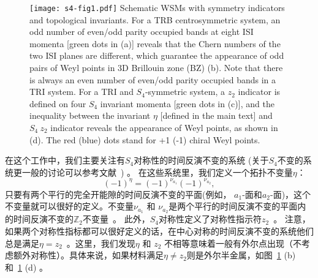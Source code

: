 \begin{figure}[!tb]
    \centering
    \texttt{[image: s4-fig1.pdf]}
        {Schematic WSMs with symmetry indicators and topological invariants.
        For a TRB centrosymmetric system, an odd number of even/odd parity occupied bands at eight ISI momenta [green dots in (a)] reveals that the Chern numbers of the two ISI planes are different, which guarantee the appearance of odd pairs of Weyl points in 3D Brillouin zone (BZ) (b). Note that there is always an even number of even/odd parity occupied bands in a TRI system.
        For a TRI and $S_4$-symmetric system, a $z_2$ indicator is defined on four $S_4$ invariant momenta [green dots in (c)], and the inequality between the invariant $\eta$ [defined in the main text] and $S_4~z_2$ indicator reveals the appearance of Weyl points, as shown in (d). The red (blue) dots stand for +1 (-1) chiral Weyl points. ~\citep{Qians4}
    } 
    \label{fig:5-1}
\end{figure}

在这个工作中，我们主要关注有$S_4$对称性的时间反演不变的系统 (关于$S_4$不变的系统更一般的讨论可以参考文献~\citep{tobedone2019}) 。
在这些系统里，我们定义一个拓扑不变量$\eta$：
\begin{equation*}
(-1)^{\eta}=(-1)^{\nu_{a_1}}(-1)^{\nu_{a_2}},
\end{equation*}
只要有两个平行的完全开能隙的时间反演不变的平面(例如， $a_1$-面和$a_2$-面)，这个不变量就可以很好的定义。不变量$\nu_{a_1}$ 和 $\nu_{a_2}$是两个平行的时间反演不变的平面内的时间反演不变的$\mathbb Z_2$不变量~\citep{Kane2005}。
此外，$ S_4 $对称性定义了对称性指示符$z_2$~\citep{song2017,haruki2018}。
注意，如果两个对称性指标都可以很好定义的话，在中心对称的时间反演不变的系统他们总是满足$\eta=z_2$~\citep{Fu2007topo,haruki2018}。这里，我们发现$\eta$ 和 $z_2$ 不相等意味着一般有外尔点出现（不考虑额外对称性）。具体来说，如果材料满足$\eta\neq z_2$则是外尔半金属，如图~\ref{fig:5-1} (b) 和~\ref{fig:5-1} (d) 。


